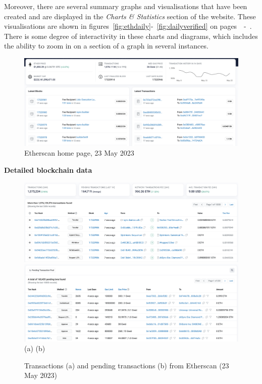 \documentclass[UTF8]{article}
\begin{document}
{Moreover, there are several summary graphs and visualisations that have been created and are displayed in the \textit{Charts \& Statistics} section of the website. These visualisations are shown in figures~\ref{fig:ethdaily}-~\ref{fig:dailyverified} on pages~\pageref{fig:ethdaily}~-~\pageref{fig:dailyverified}. There is some degree of interactivity in these charts and diagrams, which includes the ability to zoom in on a section of a graph in several instances.\\

\begin{figure}[htbp]
\begin{center}
\includegraphics[width=\linewidth]{images/etherscan}
\caption{Etherscan home page, 23 May 2023}
\label{fig:ethscan}
\end{center}
\end{figure}


\textbf{Detailed blockchain data}\\
\begin{figure}[htbp]
\begin{center}
\includegraphics[width=0.48\linewidth]{images/txns}
\includegraphics[width=0.48\linewidth]{images/pendtxns} \\
(a)\hspace{160pt}        (b)\\
\caption{Transactions (a) and pending transactions (b) from Etherscan (23 May 2023)}
\label{fig:txns}
\end{center}
\end{figure}


}
\end{document}
